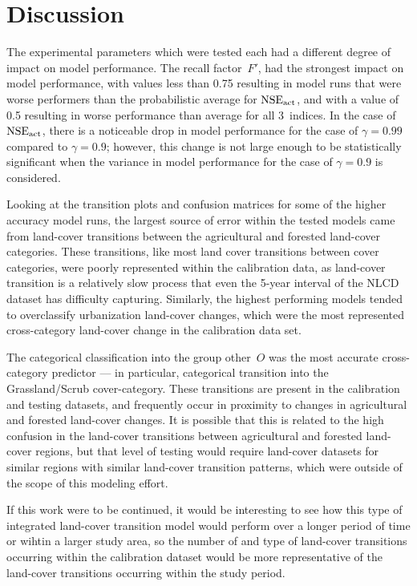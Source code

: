 \section{Discussion}
\label{sec:land_disc}

The experimental parameters which were tested each had a different degree
of impact on model performance.
The recall factor~$F'$, had the strongest impact on model performance,
with values less than 0.75 resulting in model runs that were worse performers
than the probabilistic average for $\text{NSE}_{\text{act}}$,
and with a value of 0.5 resulting in worse performance than average for
all 3~indices.
In the case of $\text{NSE}_{\text{act}}$, there is a noticeable drop in model performance
for the case of $\gamma=0.99$ compared to $\gamma=0.9$; however, 
this change is not large enough to be statistically significant when
the variance in model performance for the case of $\gamma=0.9$ is considered.

Looking at the transition plots and confusion matrices for some of the
higher accuracy model runs,
the largest source of error within the tested models came from land-cover
transitions between the agricultural and forested land-cover categories.
These transitions, like most land cover transitions between cover categories,
were poorly represented within the calibration data, as land-cover transition
is a relatively slow process that even the 5-year interval of the NLCD dataset
has difficulty capturing.
Similarly, the highest performing models tended to overclassify urbanization land-cover
changes, which were the most represented cross-category land-cover change 
in the calibration data set.

The categorical classification into the group other~$O$ was the most accurate cross-category
predictor --- in particular, categorical transition into the Grassland/Scrub cover-category.
These transitions are present in the calibration and testing datasets,
and frequently occur in proximity to changes in agricultural and forested land-cover changes.
It is possible that this is related to the high confusion in the land-cover transitions
between agricultural and forested land-cover regions, but that level of testing would
require land-cover datasets for similar regions with similar land-cover transition patterns,
which were outside of the scope of this modeling effort.

If this work were to be continued, it would be interesting to see how this type of
integrated land-cover transition model would perform over a longer period of time
or wihtin a larger study area, so the number of and type of land-cover transitions
occurring within the calibration dataset would be more representative of the
land-cover transitions occurring within the study period.
